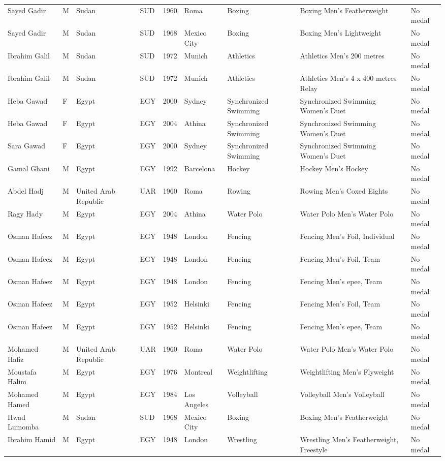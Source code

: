 \documentclass{article}%
\begin{document}
\begin{longtable}{l l l l l l l l l}
Sayed Gadir&M&Sudan&SUD&1960&Roma&Boxing&Boxing Men's Featherweight&No medal\\%
Sayed Gadir&M&Sudan&SUD&1968&Mexico City&Boxing&Boxing Men's Lightweight&No medal\\%
Ibrahim Galil&M&Sudan&SUD&1972&Munich&Athletics&Athletics Men's 200 metres&No medal\\%
Ibrahim Galil&M&Sudan&SUD&1972&Munich&Athletics&Athletics Men's 4 x 400 metres Relay&No medal\\%
Heba Gawad&F&Egypt&EGY&2000&Sydney&Synchronized Swimming&Synchronized Swimming Women's Duet&No medal\\%
Heba Gawad&F&Egypt&EGY&2004&Athina&Synchronized Swimming&Synchronized Swimming Women's Duet&No medal\\%
Sara Gawad&F&Egypt&EGY&2000&Sydney&Synchronized Swimming&Synchronized Swimming Women's Duet&No medal\\%
Gamal Ghani&M&Egypt&EGY&1992&Barcelona&Hockey&Hockey Men's Hockey&No medal\\%
Abdel Hadj&M&United Arab Republic&UAR&1960&Roma&Rowing&Rowing Men's Coxed Eights&No medal\\%
Ragy Hady&M&Egypt&EGY&2004&Athina&Water Polo&Water Polo Men's Water Polo&No medal\\%
Osman Hafeez&M&Egypt&EGY&1948&London&Fencing&Fencing Men's Foil, Individual&No medal\\%
Osman Hafeez&M&Egypt&EGY&1948&London&Fencing&Fencing Men's Foil, Team&No medal\\%
Osman Hafeez&M&Egypt&EGY&1948&London&Fencing&Fencing Men's epee, Team&No medal\\%
Osman Hafeez&M&Egypt&EGY&1952&Helsinki&Fencing&Fencing Men's Foil, Team&No medal\\%
Osman Hafeez&M&Egypt&EGY&1952&Helsinki&Fencing&Fencing Men's epee, Team&No medal\\%
Mohamed Hafiz&M&United Arab Republic&UAR&1960&Roma&Water Polo&Water Polo Men's Water Polo&No medal\\%
Moustafa Halim&M&Egypt&EGY&1976&Montreal&Weightlifting&Weightlifting Men's Flyweight&No medal\\%
Mohamed Hamed&M&Egypt&EGY&1984&Los Angeles&Volleyball&Volleyball Men's Volleyball&No medal\\%
Hwad Lumomba&M&Sudan&SUD&1968&Mexico City&Boxing&Boxing Men's Featherweight&No medal\\%
Ibrahim Hamid&M&Egypt&EGY&1948&London&Wrestling&Wrestling Men's Featherweight, Freestyle&No medal\\%

\end{longtable}
\end{document}
